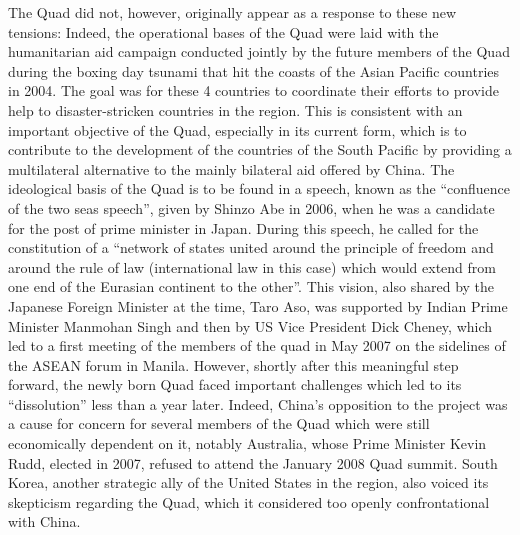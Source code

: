 \documentclass[11pt,a4paper]{article}
\begin{document}
The Quad did not, however, originally appear as a response to these new tensions: Indeed, the operational bases of the Quad were laid with the humanitarian aid campaign conducted jointly by the future members of the Quad during the boxing day tsunami that hit the coasts of the Asian Pacific countries in 2004. The goal was for these 4 countries to coordinate their efforts to provide help to disaster-stricken countries in the region. This is consistent with an important objective of the Quad, especially in its current form, which is to contribute to the development of the countries of the South Pacific by providing a multilateral alternative to the mainly bilateral aid offered by China. The ideological basis of the Quad is to be found in a speech, known as the “confluence of the two seas speech”, given by Shinzo Abe in 2006, when he was a candidate for the post of prime minister in Japan. During this speech, he called for the constitution of a “network of states united around the principle of freedom and around the rule of law (international law in this case) which would extend from one end of the Eurasian continent to the other”. This vision, also shared by the Japanese Foreign Minister at the time, Taro Aso, was supported by Indian Prime Minister Manmohan Singh and then by US Vice President Dick Cheney, which led to a first meeting of the members of the quad in May 2007 on the sidelines of the ASEAN forum in Manila. However, shortly after this meaningful step forward, the newly born Quad faced important challenges which led to its “dissolution” less than a year later. Indeed, China’s opposition to the project was a cause for concern for several members of the Quad which were still economically dependent on it, notably Australia, whose Prime Minister Kevin Rudd, elected in 2007, refused to attend the January 2008 Quad summit. South Korea, another strategic ally of the United States in the region, also voiced its skepticism regarding the Quad, which it considered too openly confrontational with China.
\end{document}
